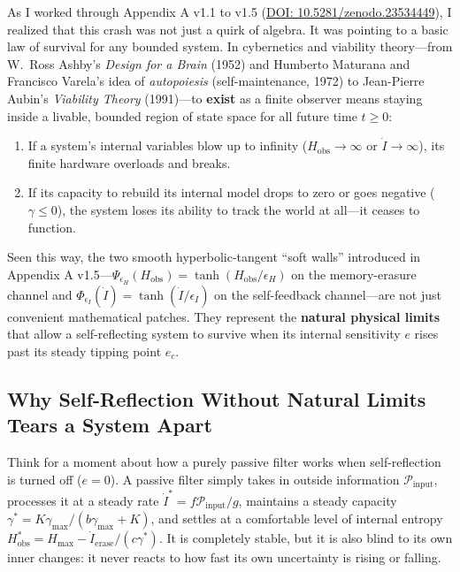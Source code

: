 \documentclass[11pt,a4paper]{article}
\theoremstyle{definition}
\begin{document}
As I worked through Appendix A v1.1 to v1.5 (\href{https://doi.org/10.5281/zenodo.23534449}{DOI: 10.5281/zenodo.23534449}), I realized that this crash was not just a quirk of algebra. It was pointing to a basic law of survival for any bounded system. In cybernetics and viability theory---from W.\ Ross Ashby's \emph{Design for a Brain} (1952) and Humberto Maturana and Francisco Varela's idea of \emph{autopoiesis} (self-maintenance, 1972) to Jean-Pierre Aubin's \emph{Viability Theory} (1991)---to \textbf{exist} as a finite observer means staying inside a livable, bounded region of state space for all future time $t \ge 0$:
\begin{enumerate}
  \item If a system's internal variables blow up to infinity ($H_{\mathrm{obs}} \to \infty$ or $\dot{I} \to \infty$), its finite hardware overloads and breaks.
  \item If its capacity to rebuild its internal model drops to zero or goes negative ($\gamma \le 0$), the system loses its ability to track the world at all---it ceases to function.
\end{enumerate}

Seen this way, the two smooth hyperbolic-tangent ``soft walls'' introduced in Appendix A v1.5---$\Psi_{\epsilon_H}(H_{\mathrm{obs}}) = \tanh(H_{\mathrm{obs}}/\epsilon_H)$ on the memory-erasure channel and $\Phi_{\epsilon_I}(\dot{I}) = \tanh(\dot{I}/\epsilon_I)$ on the self-feedback channel---are not just convenient mathematical patches. They represent the \textbf{natural physical limits} that allow a self-reflecting system to survive when its internal sensitivity $e$ rises past its steady tipping point $e_c$.

\subsection{Why Self-Reflection Without Natural Limits Tears a System Apart}

Think for a moment about how a purely passive filter works when self-reflection is turned off ($e = 0$). A passive filter simply takes in outside information $\mathcal{P}_{\mathrm{input}}$, processes it at a steady rate $\dot{I}^* = f\mathcal{P}_{\mathrm{input}}/g$, maintains a steady capacity $\gamma^* = K\gamma_{\max}/(b\gamma_{\max} + K)$, and settles at a comfortable level of internal entropy $H_{\mathrm{obs}}^* = H_{\max} - \dot{I}_{\mathrm{erase}}/(c\gamma^*)$. It is completely stable, but it is also blind to its own inner changes: it never reacts to how fast its own uncertainty is rising or falling.
\end{document}
